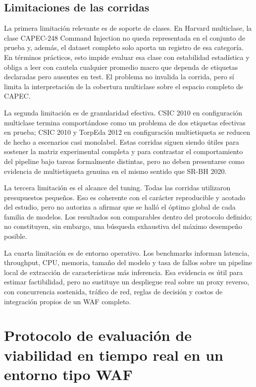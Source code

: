 \documentclass[12pt,oneside]{report}
\begin{document}
\section{Limitaciones de las corridas}
La primera limitación relevante es de soporte de clases. En Harvard multiclase, la clase CAPEC-248 Command Injection no queda representada en el conjunto de prueba y, además, el dataset completo solo aporta un registro de esa categoría. En términos prácticos, esto impide evaluar esa clase con estabilidad estadística y obliga a leer con cautela cualquier promedio macro que dependa de etiquetas declaradas pero ausentes en test. El problema no invalida la corrida, pero sí limita la interpretación de la cobertura multiclase sobre el espacio completo de CAPEC.\

La segunda limitación es de granularidad efectiva. CSIC 2010 en configuración multiclase termina comportándose como un problema de dos etiquetas efectivas en prueba; CSIC 2010 y TorpEda 2012 en configuración multietiqueta se reducen de hecho a escenarios casi monolabel. Estas corridas siguen siendo útiles para sostener la matriz experimental completa y para contrastar el comportamiento del pipeline bajo tareas formalmente distintas, pero no deben presentarse como evidencia de multietiqueta genuina en el mismo sentido que SR-BH 2020.\

La tercera limitación es el alcance del tuning. Todas las corridas utilizaron presupuestos pequeños. Eso es coherente con el carácter reproducible y acotado del estudio, pero no autoriza a afirmar que se halló el óptimo global de cada familia de modelos. Los resultados son comparables dentro del protocolo definido; no constituyen, sin embargo, una búsqueda exhaustiva del máximo desempeño posible.\

La cuarta limitación es de entorno operativo. Los benchmarks informan latencia, throughput, CPU, memoria, tamaño del modelo y tasa de fallos sobre un pipeline local de extracción de características más inferencia. Esa evidencia es útil para estimar factibilidad, pero no sustituye un despliegue real sobre un proxy reverso, con concurrencia sostenida, tráfico de red, reglas de decisión y costos de integración propios de un WAF completo.\

\chapter{Protocolo de evaluación de viabilidad en tiempo real en un entorno tipo WAF}
\end{document}
